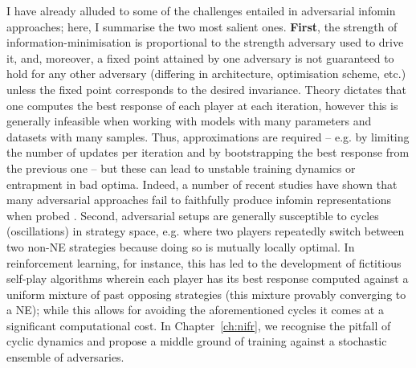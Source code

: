 I have already alluded to some of the challenges entailed in adversarial infomin
approaches; here, I summarise the two most salient ones.
%
\textbf{First}, the strength of information-minimisation is proportional to the strength
adversary used to drive it, and, moreover, a fixed point attained by one adversary is not
guaranteed to hold for any other adversary (differing in architecture, optimisation
scheme, etc.) unless the fixed point corresponds to the desired invariance. 
%
Theory dictates that one computes the best response of each player at each iteration,
however this is generally infeasible when working with models with many parameters and
datasets with many samples. 
%
Thus, approximations are required -- e.g. by limiting the number of updates per iteration
and by bootstrapping the best response from the previous one -- but these can lead to
unstable training dynamics or entrapment in bad optima. 
%
Indeed, a number of recent studies have shown that many adversarial approaches fail to
faithfully produce infomin representations when probed \citep{moyer2018invariant,
feng2019learning, balunovic2021fair}.
%
%
Second, adversarial setups are generally susceptible to cycles (oscillations) in strategy space,
e.g. where two players repeatedly switch between two non-NE strategies because doing so is mutually
locally optimal. 
%
In reinforcement learning, for instance, this has led to the development of fictitious self-play
algorithms \citep{brown1951iterative, heinrich2015fictitious, vinyals2019grandmaster} wherein each
player has its best response computed against a uniform mixture of past opposing strategies (this
mixture provably converging to a NE); while this allows for avoiding the aforementioned cycles it
comes at a significant computational cost.
%
In Chapter~\ref{ch:nifr}, we recognise the pitfall of cyclic dynamics and propose a middle ground
of training against a stochastic ensemble of adversaries.
% 




